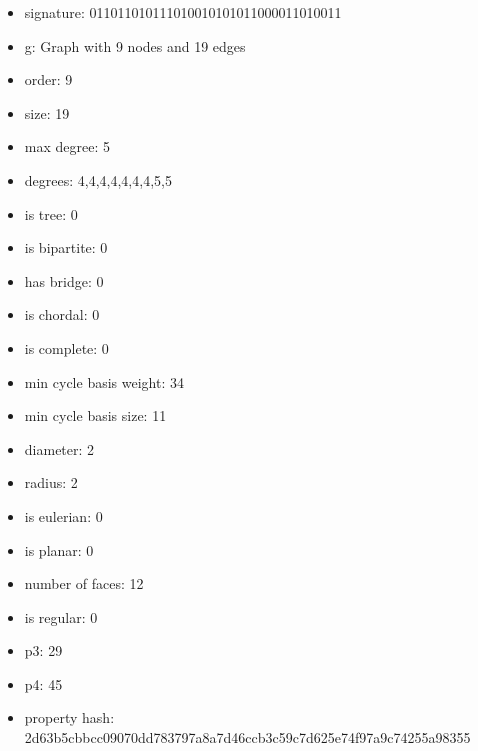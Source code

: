 \newpage
\begin{figure}
\end{figure}
\begin{itemize}
\item signature: 011011010111010010101011000011010011
\item g: Graph with 9 nodes and 19 edges
\item order: 9
\item size: 19
\item max degree: 5
\item degrees: 4,4,4,4,4,4,4,5,5
\item is tree: 0
\item is bipartite: 0
\item has bridge: 0
\item is chordal: 0
\item is complete: 0
\item min cycle basis weight: 34
\item min cycle basis size: 11
\item diameter: 2
\item radius: 2
\item is eulerian: 0
\item is planar: 0
\item number of faces: 12
\item is regular: 0
\item p3: 29
\item p4: 45
\item property hash: 2d63b5cbbcc09070dd783797a8a7d46ccb3c59c7d625e74f97a9c74255a98355
\end{itemize}
